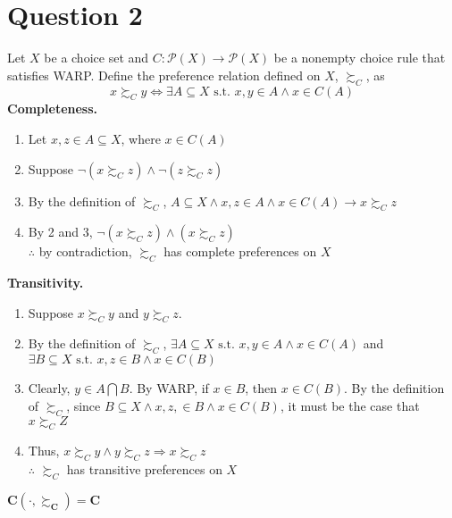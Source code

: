 \documentclass{article}
\newcommand{\intersect}{\bigcap}
\renewcommand{\P}{\mathcal{P}}
\begin{document}
\pagebreak
\section*{Question 2}
Let $X$ be a choice set and $C:\P(X)\rightarrow\P(X)$ be a nonempty choice rule that satisfies WARP. Define the preference relation defined on $X$, $\succsim_C$, as
\[
	x\succsim_C y \iff \exists A\subseteq X\text{ s.t. } x,y\in A\land x\in C(A)
\]
\textbf{Completeness.}
\begin{enumerate}
	\item Let $x,z\in A\subseteq X$, where $x\in C(A)$
	
	\item Suppose $\neg(x\succsim_C z)\land\neg(z\succsim_C z)$
	
	\item By the definition of $\succsim_C$, $A\subseteq X\land x,z\in A\land x\in C(A)\rightarrow x\succsim_C z$ 
	
	\item By 2 and 3, $\neg(x\succsim_C z)\land (x\succsim_C z)$
	\medskip \\
	$\therefore$ by contradiction, $\succsim_C$ has complete preferences on $X$
	
\end{enumerate}
\textbf{Transitivity.}
\begin{enumerate}
	\item Suppose $x\succsim_C y$ and $y\succsim_C z$.
	
	\item By the definition of $\succsim_C$, $\exists A\subseteq X\text{ s.t. } x,y\in A\land x\in C(A)$ and ${\exists B\subseteq X\text{ s.t. } x,z\in B\land x\in C(B)}$
	
	\item Clearly, $y\in A\intersect B$. By WARP, if $x\in B$, then $x\in C(B)$. By the definition of $\succsim_C$, since $B\subseteq X\land x,z,\in B\land x\in C(B)$, it must be the case that $x\succsim_C Z$
	
	\item Thus, $x\succsim_C y \land y\succsim_C z \Rightarrow x\succsim_C z$
	\medskip \\
	$\therefore$ $\succsim_C$ has transitive preferences on $X$
	
\end{enumerate}
$\mathbf{C\left(\cdot,\succsim_C\right)=C}$
\end{document}
